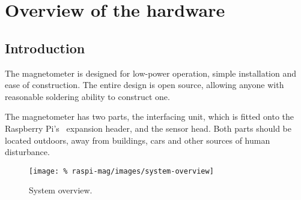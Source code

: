 \chapter{Overview of the hardware}

\section{Introduction}
The magnetometer is designed for low-power operation, simple
installation and ease of construction. The entire design is open
source, allowing anyone with reasonable soldering ability to construct
one.

The magnetometer has two parts, the interfacing unit, which is fitted
onto the Raspberry Pi's \gpio\ expansion header, and the sensor
head. Both parts should be located outdoors, away from buildings, cars
and other sources of human disturbance. 

\begin{figure}
  \centering
  \texttt{[image: \%
    raspi-mag/images/system-overview]}
  \caption[System overview]%
  {System overview.}
  \label{fig:system-overview}
\end{figure}

